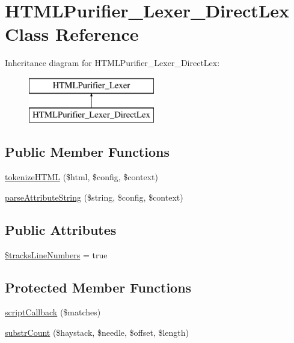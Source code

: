 \hypertarget{classHTMLPurifier__Lexer__DirectLex}{\section{H\+T\+M\+L\+Purifier\+\_\+\+Lexer\+\_\+\+Direct\+Lex Class Reference}
\label{classHTMLPurifier__Lexer__DirectLex}
}
Inheritance diagram for H\+T\+M\+L\+Purifier\+\_\+\+Lexer\+\_\+\+Direct\+Lex\+:\begin{figure}[H]
\begin{center}
\leavevmode
\includegraphics[height=2.000000cm]{classHTMLPurifier__Lexer__DirectLex}
\end{center}
\end{figure}
\subsection*{Public Member Functions}
\begin{DoxyCompactItemize}
\item 
\hyperlink{classHTMLPurifier__Lexer__DirectLex_abc84e725178c33037e32dca566facf9d}{tokenize\+H\+T\+M\+L} (\$html, \$config, \$context)
\item 
\hyperlink{classHTMLPurifier__Lexer__DirectLex_a35be284c51f0bb455f6269efb9f83da8}{parse\+Attribute\+String} (\$string, \$config, \$context)
\end{DoxyCompactItemize}
\subsection*{Public Attributes}
\begin{DoxyCompactItemize}
\item 
\hyperlink{classHTMLPurifier__Lexer__DirectLex_a273c45a399a2544879ecac2ffa3a2fd8}{\$tracks\+Line\+Numbers} = true
\end{DoxyCompactItemize}
\subsection*{Protected Member Functions}
\begin{DoxyCompactItemize}
\item 
\hyperlink{classHTMLPurifier__Lexer__DirectLex_aa405d2df7279fad3430b71f1faf013a3}{script\+Callback} (\$matches)
\item 
\hyperlink{classHTMLPurifier__Lexer__DirectLex_a4ef10ec2d3f1253d371864cea464b9aa}{substr\+Count} (\$haystack, \$needle, \$offset, \$length)
\end{DoxyCompactItemize}
